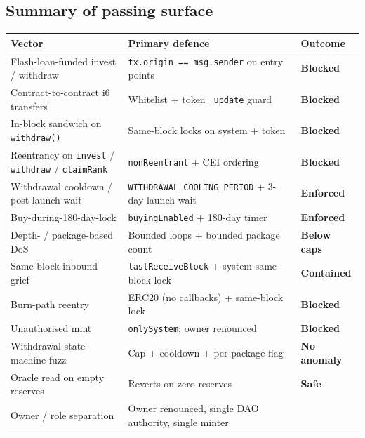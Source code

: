 \documentclass[11pt,a4paper]{article}
\begin{document}
\subsection{Summary of passing surface}

\begin{center}
\renewcommand{\arraystretch}{1.35}
\begin{tabular}{p{5.6cm} p{5.4cm} p{3.5cm}}
\toprule
\textbf{Vector} & \textbf{Primary defence} & \textbf{Outcome} \\
\midrule
Flash-loan-funded invest / withdraw
    & \texttt{tx.origin == msg.sender} on entry points
    & \textcolor{passgreen}{\textbf{Blocked}} \\
Contract-to-contract i6 transfers
    & Whitelist + token \texttt{\_update} guard
    & \textcolor{passgreen}{\textbf{Blocked}} \\
In-block sandwich on \texttt{withdraw()}
    & Same-block locks on system + token
    & \textcolor{passgreen}{\textbf{Blocked}} \\
Reentrancy on \texttt{invest} / \texttt{withdraw} / \texttt{claimRank}
    & \texttt{nonReentrant} + CEI ordering
    & \textcolor{passgreen}{\textbf{Blocked}} \\
Withdrawal cooldown / post-launch wait
    & \texttt{WITHDRAWAL\_COOLING\_PERIOD} + 3-day launch wait
    & \textcolor{passgreen}{\textbf{Enforced}} \\
Buy-during-180-day-lock
    & \texttt{buyingEnabled} + 180-day timer
    & \textcolor{passgreen}{\textbf{Enforced}} \\
Depth- / package-based DoS
    & Bounded loops + bounded package count
    & \textcolor{passgreen}{\textbf{Below caps}} \\
Same-block inbound grief
    & \texttt{lastReceiveBlock} + system same-block lock
    & \textcolor{passgreen}{\textbf{Contained}} \\
Burn-path reentry
    & ERC20 (no callbacks) + same-block lock
    & \textcolor{passgreen}{\textbf{Blocked}} \\
Unauthorised mint
    & \texttt{onlySystem}; owner renounced
    & \textcolor{passgreen}{\textbf{Blocked}} \\
Withdrawal-state-machine fuzz
    & Cap + cooldown + per-package flag
    & \textcolor{passgreen}{\textbf{No anomaly}} \\
Oracle read on empty reserves
    & Reverts on zero reserves
    & \textcolor{passgreen}{\textbf{Safe}} \\
Owner / role separation
    & Owner renounced, single DAO authority, single minter

\end{tabular}
\end{center}
\end{document}
